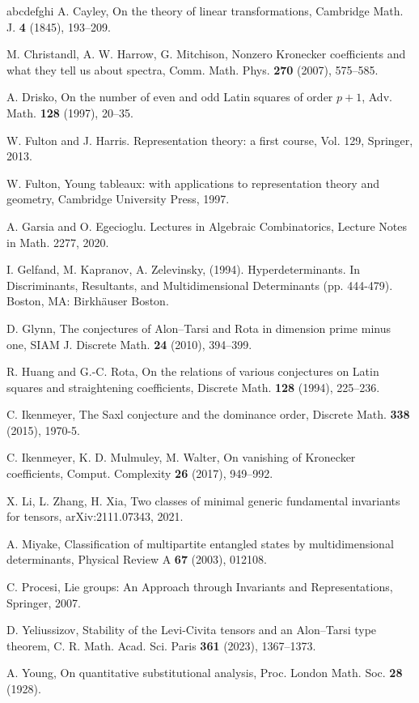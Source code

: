 \documentclass[12pt, reqno]{amsart}
\theoremstyle{definition}
\begin{document}
\begin{thebibliography}{abcdefghi}
A. Cayley, On the theory of linear transformations, Cambridge Math. J. {\bf 4} (1845), 193--209.

M. Christandl, A. W. Harrow, G. Mitchison, Nonzero Kronecker coefficients and what they tell us about spectra, Comm. Math. Phys. {\bf 270} (2007), 575--585.


A. Drisko, On the number of even and odd Latin squares of order $p + 1$, Adv. Math. {\bf 128} (1997), 20--35.


W. Fulton and J. Harris. Representation theory: a first course, Vol. 129, Springer, 2013.

W. Fulton, Young tableaux: with applications to representation theory and geometry, Cambridge University Press, 1997.

A. Garsia and O. Egecioglu. Lectures in Algebraic Combinatorics, Lecture Notes in Math. 2277, 2020.

I. Gelfand, M. Kapranov, A. Zelevinsky, (1994). Hyperdeterminants. In Discriminants, Resultants, and Multidimensional Determinants (pp. 444-479). Boston, MA: Birkhäuser Boston.

D. Glynn, The conjectures of Alon--Tarsi and Rota in dimension prime minus one, SIAM J. Discrete Math. {\bf 24} (2010), 394--399.

R. Huang and G.-C. Rota, On the relations of various conjectures on Latin squares and straightening coefficients, Discrete Math. {\bf 128} (1994), 225--236.

C. Ikenmeyer, The Saxl conjecture and the dominance order, Discrete Math. {\bf 338} (2015), 1970-5.

C. Ikenmeyer, K. D. Mulmuley, M. Walter, On vanishing of Kronecker coefficients, Comput. Complexity {\bf 26} (2017), 949--992. %


X. Li, L. Zhang, H. Xia, Two classes of minimal generic fundamental invariants for tensors, arXiv:2111.07343, 2021.

A. Miyake, Classification of multipartite entangled states by multidimensional determinants, Physical Review A {\bf 67} (2003),  012108.

C. Procesi, Lie groups: An Approach through Invariants and Representations, Springer, 2007.


D. Yeliussizov, Stability of the Levi-Civita tensors and an Alon--Tarsi type theorem, 
C. R. Math. Acad. Sci. Paris {\bf 361} (2023), 1367--1373.

A. Young, On quantitative substitutional analysis, Proc. London Math. Soc. {\bf 28} (1928).

\end{thebibliography}
\end{document}
